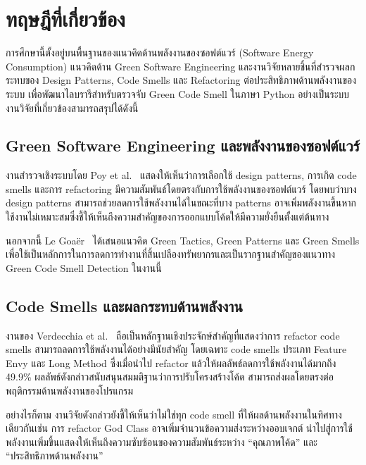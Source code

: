 \chapter{ทฤษฎีที่เกี่ยวข้อง}
\label{Ch:Background}
การศึกษานี้ตั้งอยู่บนพื้นฐานของแนวคิดด้านพลังงานของซอฟต์แวร์ (Software Energy Consumption) แนวคิดด้าน Green Software Engineering และงานวิจัยหลายชิ้นที่สำรวจผลกระทบของ Design Patterns, Code Smells และ Refactoring ต่อประสิทธิภาพด้านพลังงานของระบบ เพื่อพัฒนาไลบรารีสำหรับตรวจจับ Green Code Smell ในภาษา Python อย่างเป็นระบบ งานวิจัยที่เกี่ยวข้องสามารถสรุปได้ดังนี้


\section{Green Software Engineering และพลังงานของซอฟต์แวร์}
งานสำรวจเชิงระบบโดย Poy et al.~\cite{poy2025impact} แสดงให้เห็นว่าการเลือกใช้ design patterns, การเกิด code smells และการ refactoring มีความสัมพันธ์โดยตรงกับการใช้พลังงานของซอฟต์แวร์ โดยพบว่าบาง design patterns สามารถช่วยลดการใช้พลังงานได้ในขณะที่บาง patterns อาจเพิ่มพลังงานขึ้นหากใช้งานไม่เหมาะสมซึ่งชี้ให้เห็นถึงความสำคัญของการออกแบบโค้ดให้มีความยั่งยืนตั้งแต่ต้นทาง

นอกจากนี้ Le Goaër~\cite{leGoaer2024tactics} ได้เสนอแนวคิด Green Tactics, Green Patterns และ Green Smells เพื่อใช้เป็นหลักการในการลดการทำงานที่สิ้นเปลืองทรัพยากรและเป็นรากฐานสำคัญของแนวทาง Green Code Smell Detection ในงานนี้


\section{Code Smells และผลกระทบด้านพลังงาน}
งานของ Verdecchia et al.~\cite{verdecchia2018energy} ถือเป็นหลักฐานเชิงประจักษ์สำคัญที่แสดงว่าการ refactor code smells สามารถลดการใช้พลังงานได้อย่างมีนัยสำคัญ โดยเฉพาะ code smells ประเภท Feature Envy และ Long Method ซึ่งเมื่อนำไป refactor แล้วให้ผลลัพธ์ลดการใช้พลังงานได้มากถึง 49.9\% ผลลัพธ์ดังกล่าวสนับสนุนสมมติฐานว่าการปรับโครงสร้างโค้ด สามารถส่งผลโดยตรงต่อพฤติกรรมด้านพลังงานของโปรแกรม

อย่างไรก็ตาม งานวิจัยดังกล่าวยังชี้ให้เห็นว่าไม่ใช่ทุก code smell ที่ให้ผลด้านพลังงานในทิศทางเดียวกันเช่น การ refactor God Class อาจเพิ่มจำนวนข้อความส่งระหว่างออบเจกต์ นำไปสู่การใช้พลังงานเพิ่มขึ้นแสดงให้เห็นถึงความซับซ้อนของความสัมพันธ์ระหว่าง “คุณภาพโค้ด” และ “ประสิทธิภาพด้านพลังงาน”

